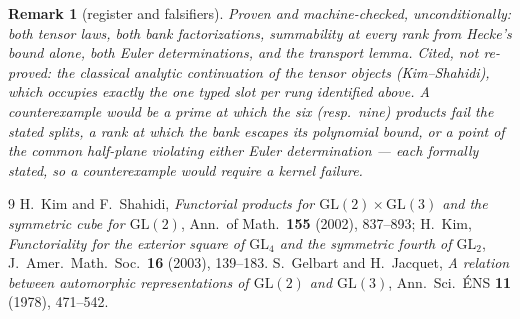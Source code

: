 \documentclass[11pt]{article}
\newtheorem{remark}[theorem]{Remark}
\begin{document}
\begin{remark}[register and falsifiers]
Proven and machine-checked, unconditionally: both tensor laws, both bank factorizations,
summability at every rank from Hecke's bound alone, both Euler determinations, and the
transport lemma.  Cited, not re-proved: the classical analytic continuation of the
tensor objects (Kim--Shahidi), which occupies exactly the one typed slot per rung
identified above.  A counterexample would be a prime at which the six (resp.\ nine)
products fail the stated splits, a rank at which the bank escapes its polynomial bound,
or a point of the common half-plane violating either Euler determination --- each
formally stated, so a counterexample would require a kernel failure.
\end{remark}

\begin{thebibliography}{9}
 H.~Kim and F.~Shahidi, \emph{Functorial products for
$\mathrm{GL}(2)\times\mathrm{GL}(3)$ and the symmetric cube for $\mathrm{GL}(2)$},
Ann.\ of Math.\ \textbf{155} (2002), 837--893; H.~Kim, \emph{Functoriality for the
exterior square of $\mathrm{GL}_4$ and the symmetric fourth of $\mathrm{GL}_2$},
J.\ Amer.\ Math.\ Soc.\ \textbf{16} (2003), 139--183.
 S.~Gelbart and H.~Jacquet, \emph{A relation between automorphic
representations of $\mathrm{GL}(2)$ and $\mathrm{GL}(3)$}, Ann.\ Sci.\ \'ENS
\textbf{11} (1978), 471--542.
\end{thebibliography}
\end{document}
